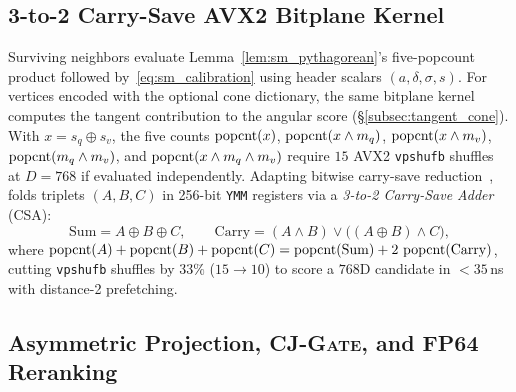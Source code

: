 \subsection{3-to-2 Carry-Save AVX2 Bitplane Kernel}
\label{subsec:csa_kernel}

Surviving neighbors evaluate Lemma~\ref{lem:sm_pythagorean}'s five-popcount product followed by~\eqref{eq:sm_calibration} using header scalars $(a, \delta, \sigma, s)$.
For vertices encoded with the optional cone dictionary, the same bitplane kernel computes the tangent contribution to the angular score (\S\ref{subsec:tangent_cone}).
With $x = s_q \oplus s_v$, the five counts $\operatorname{popcnt}(x)$, $\operatorname{popcnt}(x \wedge m_q)$, $\operatorname{popcnt}(x \wedge m_v)$, $\operatorname{popcnt}(m_q \wedge m_v)$, and $\operatorname{popcnt}(x \wedge m_q \wedge m_v)$ require $15$ {AVX2} \texttt{vpshufb} shuffles~\cite{mula2018faster} at $D=768$ if evaluated independently.
Adapting bitwise carry-save reduction~\cite{mula2018faster}, \rquiver{} folds triplets $(A, B, C)$ in 256-bit \texttt{YMM} registers via a \emph{3-to-2 Carry-Save Adder} ({CSA}):
\begin{equation}
  \mathrm{Sum} = A \oplus B \oplus C, \qquad
  \mathrm{Carry} = (A \wedge B) \vee \bigl((A \oplus B) \wedge C\bigr),
  \label{eq:csa_identity}
\end{equation}
where $\operatorname{popcnt}(A) + \operatorname{popcnt}(B) + \operatorname{popcnt}(C) = \operatorname{popcnt}(\mathrm{Sum}) + 2\,\operatorname{popcnt}(\mathrm{Carry})$, cutting \texttt{vpshufb} shuffles by $33\%$ ($15 \to 10$) to score a $768$D candidate in $<35$\,ns with distance-2 prefetching.

\subsection{Asymmetric Projection, \textsc{CJ-Gate}, and FP64 Reranking}
\label{subsec:stage05_rerank}

